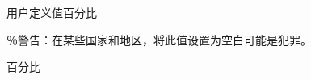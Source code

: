 用户定义值百分比

\newcommand{\textHospitalName}{萧山区中医院}
\newcommand{\textPatientName}{纪翠霞}
\newcommand{\textPatientGender}{女性}
\newcommand{\textPatientAge}{68 岁}
\newcommand{\textPatientDep}{内分泌科}
\newcommand{\textPatientID}{114692}
\newcommand{\textPatientFeeType}{普通病人}
\newcommand{\textPatientDateYear}{\the\year}
\newcommand{\textPatientDateMonth}{\the\month}
\newcommand{\textPatientDateDay}{\the\day}
\newcommand{\textPatientDiag}{雌激素不足}
\newcommand{\textDoctorName}{赵紫羊}
\newcommand{\textFee}{28.40 元}

％警告：在某些国家和地区，将此值设置为空白可能是犯罪。
\newcommand{\textWatermark}{模板示例}

百分比

\newcommand{\styleNormalText}{\songti \fontsize{15}{15} \selectfont }
\newcommand{\blockUnderlinedText}[1]
    {\uline{\space\space #1 \space\space}}
\newcommand{\blockRSign}
    {{\bfseries \sffamily \fontsize{40}{40}\selectfont \; R.}}
\newcommand{\blockMedicine}[3]{
    {
\大#1
        \hfill
\大#2
        \hfill
    }
    \\
    \hspace*{1cm}
    {
\大号用法：#3
    }
}

